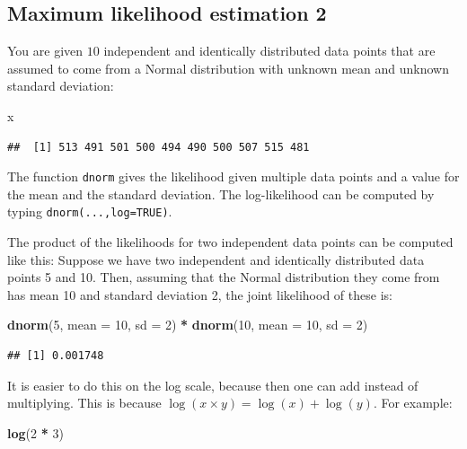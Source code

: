 \documentclass[12pt,]{krantz}
\newenvironment{Shaded}{\begin{snugshade}}{\end{snugshade}}
\newcommand{\DataTypeTok}[1]{\textcolor[rgb]{0.13,0.29,0.53}{#1}}
\newcommand{\DecValTok}[1]{\textcolor[rgb]{0.00,0.00,0.81}{#1}}
\newcommand{\KeywordTok}[1]{\textcolor[rgb]{0.13,0.29,0.53}{\textbf{#1}}}
\newcommand{\NormalTok}[1]{#1}
\newcommand{\OperatorTok}[1]{\textcolor[rgb]{0.81,0.36,0.00}{\textbf{#1}}}
\newcommand{\StringTok}[1]{\textcolor[rgb]{0.31,0.60,0.02}{#1}}
\begin{document}
\hypertarget{sec:FoundationsexercisesMLE2}{%
\subsection{Maximum likelihood estimation 2}\label{sec:FoundationsexercisesMLE2}}

You are given \(10\) independent and identically distributed data points that are assumed to come from a Normal distribution with unknown mean and unknown standard deviation:

\begin{Shaded}
\begin{Highlighting}[]
\NormalTok{x}
\end{Highlighting}
\end{Shaded}

\begin{verbatim}
##  [1] 513 491 501 500 494 490 500 507 515 481
\end{verbatim}

The function \texttt{dnorm} gives the likelihood given multiple data points and a value for the mean and the standard deviation. The log-likelihood can be computed by typing \texttt{dnorm(...,log=TRUE)}.

The product of the likelihoods for two independent data points can be computed like this: Suppose we have two independent and identically distributed data points 5 and 10. Then, assuming that the Normal distribution they come from has mean 10 and standard deviation 2, the joint likelihood of these is:

\begin{Shaded}
\begin{Highlighting}[]
\KeywordTok{dnorm}\NormalTok{(}\DecValTok{5}\NormalTok{, }\DataTypeTok{mean =} \DecValTok{10}\NormalTok{, }\DataTypeTok{sd =} \DecValTok{2}\NormalTok{) }\OperatorTok{*}\StringTok{ }\KeywordTok{dnorm}\NormalTok{(}\DecValTok{10}\NormalTok{, }\DataTypeTok{mean =} \DecValTok{10}\NormalTok{, }
  \DataTypeTok{sd =} \DecValTok{2}\NormalTok{)}
\end{Highlighting}
\end{Shaded}

\begin{verbatim}
## [1] 0.001748
\end{verbatim}

It is easier to do this on the log scale, because then one can add instead of multiplying. This is because \(\log(x\times y)= \log(x) + \log(y)\). For example:

\begin{Shaded}
\begin{Highlighting}[]
\KeywordTok{log}\NormalTok{(}\DecValTok{2} \OperatorTok{*}\StringTok{ }\DecValTok{3}\NormalTok{)}
\end{Highlighting}
\end{Shaded}
\end{document}
